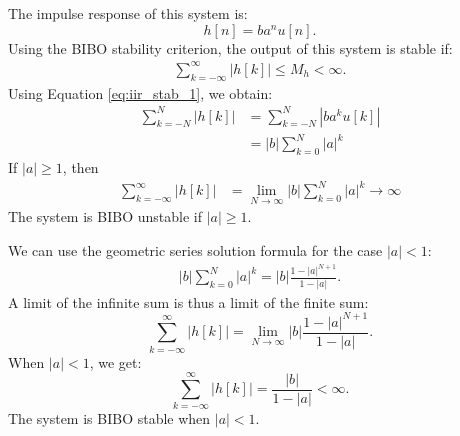 The impulse response of this system is:
\begin{equation}
h[n] = b a^n u[n].
\label{eq:iir_stab_1}
\end{equation}
Using the BIBO stability criterion, the output of this system is
stable if:
\begin{align}
\sum_{k=-\infty}^{\infty} |h[k]| \le M_h < \infty.
\end{align}
Using Equation \ref{eq:iir_stab_1}, we obtain:
\begin{align}
\sum_{k=-N}^{N} |h[k]| &= \sum_{k=-N}^{N} |b a^k u[k]|\\
&= |b| \sum_{k=0}^{N}|a|^k
\end{align}
If $|a|\ge 1$, then
\begin{align}
\sum_{k=-\infty}^{\infty} |h[k]| &= \lim_{N\rightarrow \infty} |b| \sum_{k=0}^{N}|a|^k \rightarrow \infty
\end{align}
The system is BIBO unstable if $|a| \ge 1$.

We can use the geometric series solution formula for the case $|a| < 1$:
\begin{align}
|b| \sum_{k=0}^{N}|a|^k = |b| \frac{1-|a|^{N+1}}{1-|a|}.
\end{align}
A limit of the infinite sum is thus a limit of the finite sum:
\begin{equation}
\sum_{k=-\infty}^{\infty} |h[k]| = \lim_{N\rightarrow \infty} |b|\frac{1-|a|^{N+1}}{1-|a|}.
\end{equation}
When $|a|<1$, we get:
\begin{equation}
\sum_{k=-\infty}^{\infty} |h[k]| = \frac{|b|}{1-|a|} < \infty.
\end{equation}
The system is BIBO stable when $|a|<1$.

